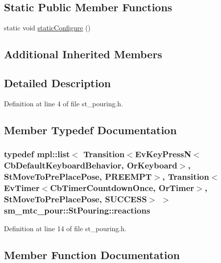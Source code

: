 \subsection*{Static Public Member Functions}
\begin{DoxyCompactItemize}
\item 
static void \hyperlink{structsm__mtc__pour_1_1StPouring_aa2b2d2a76e580104cb473da949254e1f}{static\+Configure} ()
\end{DoxyCompactItemize}
\subsection*{Additional Inherited Members}


\subsection{Detailed Description}


Definition at line 4 of file st\+\_\+pouring.\+h.



\subsection{Member Typedef Documentation}
\subsubsection[{\texorpdfstring{reactions}{reactions}}]{\setlength{\rightskip}{0pt plus 5cm}typedef mpl\+::list$<$ Transition$<$Ev\+Key\+PressN$<$Cb\+Default\+Keyboard\+Behavior, {\bf Or\+Keyboard}$>$, {\bf St\+Move\+To\+Pre\+Place\+Pose}, {\bf P\+R\+E\+E\+M\+PT}$>$, Transition$<$Ev\+Timer$<$Cb\+Timer\+Countdown\+Once, {\bf Or\+Timer}$>$, {\bf St\+Move\+To\+Pre\+Place\+Pose}, {\bf S\+U\+C\+C\+E\+SS}$>$ $>$ {\bf sm\+\_\+mtc\+\_\+pour\+::\+St\+Pouring\+::reactions}}\hypertarget{structsm__mtc__pour_1_1StPouring_ad1524f087d6747bfe4bd7dbf9ca42e78}{}\label{structsm__mtc__pour_1_1StPouring_ad1524f087d6747bfe4bd7dbf9ca42e78}


Definition at line 14 of file st\+\_\+pouring.\+h.



\subsection{Member Function Documentation}
